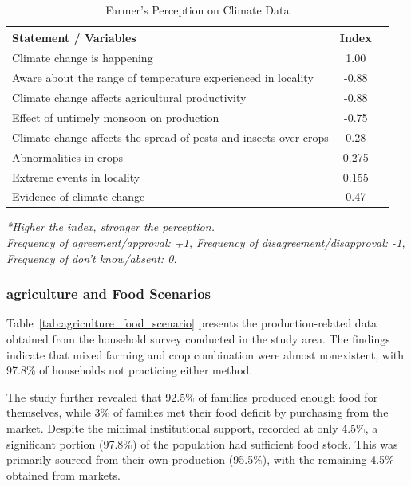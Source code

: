 \begin{table}[htbp]
    \centering
    \caption{Farmer’s Perception on Climate Data}
    \label{tab:farmer_perception}
    \begin{tabular}{@{}lcc@{}}
        \toprule
        \textbf{Statement / Variables} & \textbf{Index} \\
        \midrule
        Climate change is happening & 1.00 \\
        Aware about the range of temperature experienced in locality & -0.88 \\
        Climate change affects agricultural productivity & -0.88 \\
        Effect of untimely monsoon on production & -0.75 \\
        Climate change affects the spread of pests and insects over crops & 0.28 \\
        Abnormalities in crops & 0.275 \\
        Extreme events in locality & 0.155 \\
        Evidence of climate change & 0.47 \\
        \bottomrule
    \end{tabular}
    \vspace{0.5cm}

    \textit{*Higher the index, stronger the perception.} \\
    \textit{Frequency of agreement/approval: +1, Frequency of disagreement/disapproval: -1, Frequency of don't know/absent: 0.}
\end{table}

\subsubsection{agriculture and Food Scenarios}
Table~\ref{tab:agriculture_food_scenario} presents the production-related data obtained from the household survey conducted in the study area. The findings indicate that mixed farming and crop combination were almost nonexistent, with 97.8\% of households not practicing either method. 

The study further revealed that 92.5\% of families produced enough food for themselves, while 3\% of families met their food deficit by purchasing from the market. Despite the minimal institutional support, recorded at only 4.5\%, a significant portion (97.8\%) of the population had sufficient food stock. This was primarily sourced from their own production (95.5\%), with the remaining 4.5\% obtained from markets. 

